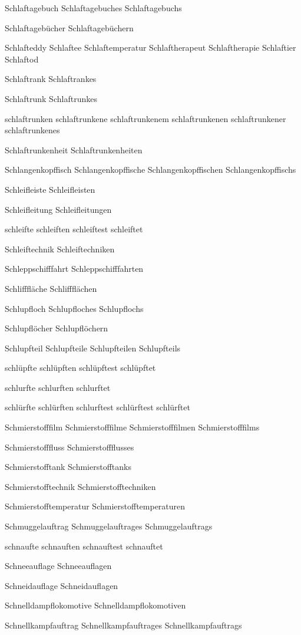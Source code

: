 Schlaftagebuch
Schlaftagebuches
Schlaftagebuchs

Schlaftagebücher
Schlaftagebüchern

Schlafteddy 
Schlaftee 
Schlaftemperatur 
Schlaftherapeut 
Schlaftherapie 
Schlaftier 
Schlaftod

Schlaftrank
Schlaftrankes

Schlaftrunk
Schlaftrunkes

schlaftrunken
schlaftrunkene
schlaftrunkenem
schlaftrunkenen
schlaftrunkener
schlaftrunkenes

Schlaftrunkenheit
Schlaftrunkenheiten

Schlangenkopffisch
Schlangenkopffische
Schlangenkopffischen
Schlangenkopffischs

Schleifleiste
Schleifleisten

Schleifleitung
Schleifleitungen

schleifte
schleiften
schleiftest
schleiftet

Schleiftechnik
Schleiftechniken

Schleppschifffahrt
Schleppschifffahrten

Schlifffläche
Schliffflächen

Schlupfloch
Schlupfloches
Schlupflochs

Schlupflöcher
Schlupflöchern

Schlupfteil
Schlupfteile
Schlupfteilen
Schlupfteils

schlüpfte
schlüpften
schlüpftest
schlüpftet

schlurfte
schlurften
schlurftet

schlürfte
schlürften
schlurftest
schlürftest
schlürftet

Schmierstofffilm
Schmierstofffilme
Schmierstofffilmen
Schmierstofffilms

Schmierstofffluss
Schmierstoffflusses

Schmierstofftank
Schmierstofftanks

Schmierstofftechnik
Schmierstofftechniken

Schmierstofftemperatur
Schmierstofftemperaturen

Schmuggelauftrag
Schmuggelauftrages
Schmuggelauftrags

schnaufte
schnauften
schnauftest
schnauftet

Schneeauflage
Schneeauflagen

Schneidauflage
Schneidauflagen

Schnelldampflokomotive
Schnelldampflokomotiven

Schnellkampfauftrag
Schnellkampfauftrages
Schnellkampfauftrags

